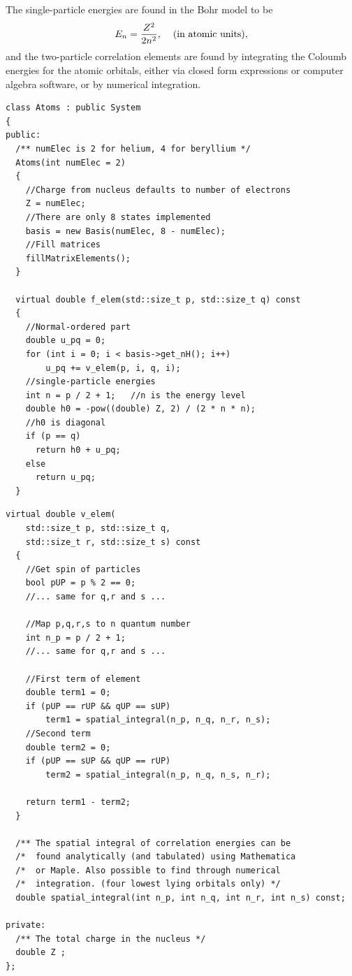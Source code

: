 The single-particle energies are found in the Bohr model to be
\begin{equation}
E_n = \frac{Z^2}{2n^2}, \hspace{4mm}\textrm{(in atomic units)},
\end{equation}
and the two-particle correlation elements are found by integrating the Coloumb energies for the atomic orbitals, either via closed form expressions or computer algebra software, or by numerical integration.
\begin{lstlisting}[float,label={lst:qDots:atoms_p1},caption={Simple implementation for the first sharp atomic orbitals. Continued in listing~\ref{lst:qDots:atoms_p2}.},name={lst:qDots:atoms}]
class Atoms : public System
{
public:
  /** numElec is 2 for helium, 4 for beryllium */
  Atoms(int numElec = 2)
  {
    //Charge from nucleus defaults to number of electrons
    Z = numElec;
    //There are only 8 states implemented
    basis = new Basis(numElec, 8 - numElec);
    //Fill matrices
    fillMatrixElements();
  }

  virtual double f_elem(std::size_t p, std::size_t q) const
  {
    //Normal-ordered part
    double u_pq = 0;
    for (int i = 0; i < basis->get_nH(); i++)
        u_pq += v_elem(p, i, q, i);
	//single-particle energies
    int n = p / 2 + 1;	 //n is the energy level
	double h0 = -pow((double) Z, 2) / (2 * n * n);
	//h0 is diagonal
    if (p == q)
      return h0 + u_pq;
    else
      return u_pq;
  }
\end{lstlisting}
\begin{lstlisting}[float,label={lst:qDots:atoms_p2},caption={Continuation of listing~\ref{lst:qDots:atoms_p1}.},name={lst:qDots:atoms}]
  virtual double v_elem(
    std::size_t p, std::size_t q,
    std::size_t r, std::size_t s) const
  {
    //Get spin of particles
    bool pUP = p % 2 == 0;
	//... same for q,r and s ...

    //Map p,q,r,s to n quantum number
    int n_p = p / 2 + 1;
    //... same for q,r and s ...

    //First term of element
    double term1 = 0;
    if (pUP == rUP && qUP == sUP)
        term1 = spatial_integral(n_p, n_q, n_r, n_s);
    //Second term
    double term2 = 0;
    if (pUP == sUP && qUP == rUP)
        term2 = spatial_integral(n_p, n_q, n_s, n_r);
	
    return term1 - term2;
  }

  /** The spatial integral of correlation energies can be
  /*  found analytically (and tabulated) using Mathematica
  /*  or Maple. Also possible to find through numerical
  /*  integration. (four lowest lying orbitals only) */
  double spatial_integral(int n_p, int n_q, int n_r, int n_s) const;
            
private:
  /** The total charge in the nucleus */
  double Z ;
};
\end{lstlisting}


